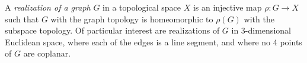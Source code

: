 \documentclass[12pt]{article}
\begin{document}
A \emph{realization of a graph} $G$ in a topological space $X$ is an injective map $\rho:G\to X$ such that $G$ with the graph topology is homeomorphic to $\rho(G)$ with the subspace topology.  Of particular interest are realizations of $G$ in 3-dimensional Euclidean space, where each of the edges is a line segment, and where no 4 points of $G$ are coplanar.
\end{document}

